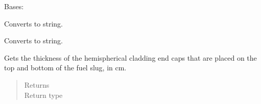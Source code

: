 \documentclass[letterpaper,10pt,openany,oneside,english]{sphinxmanual}
\begin{document}
\begin{fulllineitems}
\label{\detokenize{support_rst/fuel_bucket:fuel_bucket.FuelBucket}}
Bases: 

\begin{fulllineitems}
\label{\detokenize{support_rst/fuel_bucket:fuel_bucket.FuelBucket.__repr__}}
Converts to string.

\end{fulllineitems}


\begin{fulllineitems}
\label{\detokenize{support_rst/fuel_bucket:fuel_bucket.FuelBucket.__str__}}
Converts to string.

\end{fulllineitems}


\begin{fulllineitems}
\label{\detokenize{support_rst/fuel_bucket:fuel_bucket.FuelBucket.cladding_end_thickness}}
Gets the thickness of the hemispherical cladding end caps that are
placed on the top and bottom of the fuel slug, in cm.
\begin{quote}\begin{description}
\item[{Returns}] \leavevmode
{}

\item[{Return type}] \leavevmode
{}

\end{description}\end{quote}

\end{fulllineitems}


\end{fulllineitems}
\end{document}

